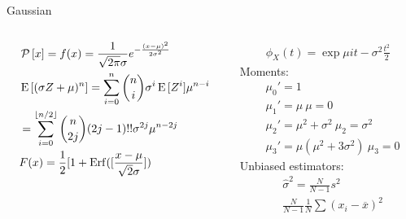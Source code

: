\documentclass[asd-beamer.tex]{subfiles}
\begin{document}
\begin{frame}{Gaussian}
	\begin{columns}[T]
		\begin{column}{0.5\textwidth}
			\begin{align*}
			&\operatorname{\mathcal{P}}{[x]}=f(x)=\frac{1}{\sqrt{2\pi}\sigma}e^{-\frac{(x-\mu)^2}{2\sigma^2}}\\
			&\operatorname{E}{[(\sigma Z+\mu)^n]}=\sum_{i=0}^n\binom{n}{i}\sigma^i\operatorname{E}{[Z^i]}\mu^{n-i}\\
			&=\sum_{i=0}^{\lfloor n/2\rfloor}\binom{n}{2j}(2j-1)!!\sigma^{2j}\mu^{n-2j}\\
			&F(x)=\frac{1}{2}[1+\operatorname{Erf}([\frac{x-\mu}{\sqrt{2}\sigma}])
			\end{align*}
		\end{column}
		\begin{column}{0.5\textwidth}
			\begin{align*}
			\phi_X(t)=\exp{\mu it-\sigma^2\frac{t^2}{2}}
			\end{align*}
			Moments:
			\begin{align*}
			&\mu_0'=1\\
			&\mu_1'=\mu\ \mu=0\\
			&\mu_2'=\mu^2+\sigma^2\ \mu_2=\sigma^2\\
			&\mu_3'=\mu(\mu^2+3\sigma^2)\ \mu_3=0
			\end{align*}
			Unbiased estimators:
			\begin{align*}
			&\hat{\sigma}^2=\frac{N}{N-1}s^2\\
			&\frac{N}{N-1}\frac{1}{N}\sum(x_i-\overline{x})^2
			\end{align*}
		\end{column}
	\end{columns}
\end{frame}
\end{document}
